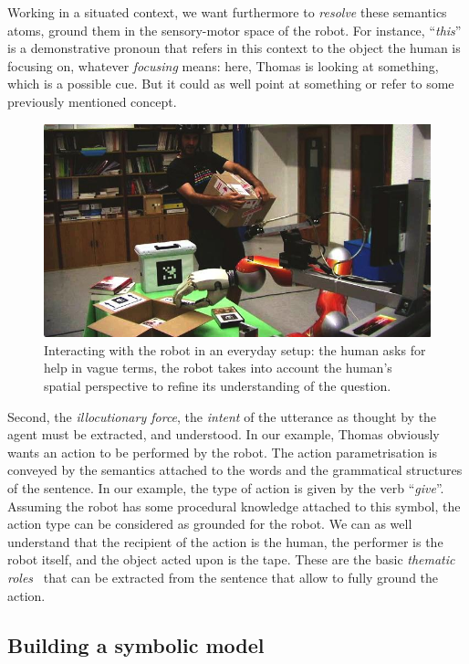 Working in a situated context, we want furthermore to \emph{resolve} these
semantics atoms, \ie ground them in the sensory-motor space of the robot. For
instance, ``\textit{this}'' is a demonstrative pronoun that refers in this
context to the object the human is focusing on, whatever \textit{focusing}
means: here, Thomas is looking at something, which is a possible cue. But it
could as well point at something or refer to some previously mentioned concept. 

\begin{figure}%
	\centering
	\includegraphics[width=0.9\linewidth]{images/dialogs/pt.jpg} 
	\caption{Interacting with
	the robot in an everyday setup: the human asks for help in vague terms, the
	robot takes into account the human's spatial perspective to refine its
	understanding of the question.} 
	\label{fig|vpt} 
\end{figure}


Second, the \emph{illocutionary force}, \ie the \emph{intent} of the utterance
as thought by the agent must be extracted, and understood. In our example,
Thomas obviously wants an action to be performed by the robot. The action
parametrisation is conveyed by the semantics attached to the words and the
grammatical structures of the sentence. In our example, the type of action is
given by the verb ``\textit{give}''. Assuming the robot has some procedural
knowledge attached to this symbol, the action type can be considered as
grounded for the robot. We can as well understand that the recipient of the
action is the human, the performer is the robot itself, and the object acted
upon is the tape. These are the basic \emph{thematic roles}~\cite{Gruber1965}
that can be extracted from the sentence that allow to fully ground the action.

\subsection{Building a symbolic model}

